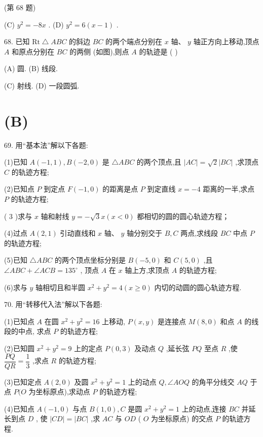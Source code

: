(第 68 题)

(C) ${y}^{2} =  - {8x}$ . (D) ${y}^{2} = 6\left( {x - 1}\right)$ .

68. 已知 $\mathrm{{Rt}}\bigtriangleup {ABC}$ 的斜边 ${BC}$ 的两个端点分别在 $x$ 轴、 $y$ 轴正方向上移动,顶点 $A$ 和原点分别在 ${BC}$ 的两侧 (如图),则点 $A$ 的轨迹是 (   )

(A) 圆. (B) 线段.

(C) 射线. (D) 一段圆弧.

\section*{(B)}

69. 用“基本法”解以下各题:

(1)已知 $A\left( {-1,1}\right) ,B\left( {-2,0}\right)$ 是 $\bigtriangleup  {ABC}$ 的两个顶点,且 $\left| {AC}\right|  = \sqrt{2}\left| {BC}\right|$ ,求顶点 $C$ 的轨迹方程;

(2)已知点 $P$ 到定点 $F\left( {-1,0}\right)$ 的距离是点 $P$ 到定直线 $x =  - 4$ 距离的一半,求点 $P$ 的轨迹方程;

( 3 )求与 $x$ 轴和射线 $y =  - \sqrt{3}x\left( {x < 0}\right)$ 都相切的圆的圆心轨迹方程；

(4)过点 $A\left( {2,1}\right)$ 引动直线和 $x$ 轴、 $y$ 轴分别交于 $B,C$ 两点,求线段 ${BC}$ 中点 $P$ 的轨迹方程;

(5)已知 $\bigtriangleup  {ABC}$ 的两个顶点坐标分别是 $B\left( {-5,0}\right)$ 和 $C\left( {5,0}\right)$ ,且 $\angle {ABC} + \angle {ACB} = {135}^{ \circ  }$ , 顶点 $A$ 在 $x$ 轴上方,求顶点 $A$ 的轨迹方程;

(6)求与 $y$ 轴相切且和半圆 ${x}^{2} + {y}^{2} = 4\left( {x \geq  0}\right)$ 内切的动圆的圆心轨迹方程.

70. 用“转移代入法”解以下各题:

(1)已知点 $A$ 在圆 ${x}^{2} + {y}^{2} = {16}$ 上移动, $P\left( {x,y}\right)$ 是连接点 $M\left( {8,0}\right)$ 和点 $A$ 的线段的中点, 求点 $P$ 的轨迹方程;

(2)已知圆 ${x}^{2} + {y}^{2} = 9$ 上的定点 $P\left( {0,3}\right)$ 及动点 $Q$ ,延长弦 ${PQ}$ 至点 $R$ ,使 $\dfrac{PQ}{QR} = \dfrac{1}{3}$ ,求点 $R$ 的轨迹方程;

(3)已知定点 $A\left( {2,0}\right)$ 及圆 ${x}^{2} + {y}^{2} = 1$ 上的动点 $Q,\angle {AOQ}$ 的角平分线交 ${AQ}$ 于点 $P(O$ 为坐标原点),求动点 $P$ 的轨迹方程;

(4)已知点 $A\left( {-1,0}\right)$ 与点 $B\left( {1,0}\right) ,C$ 是圆 ${x}^{2} + {y}^{2} = 1$ 上的动点,连接 ${BC}$ 并延长到点 $D$ , 使 $\left| {CD}\right|  = \left| {BC}\right|$ ,求 ${AC}$ 与 ${OD}$ ( $O$ 为坐标原点) 的交点 $P$ 的轨迹方程.

